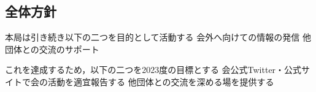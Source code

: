 \subsection*{全体方針}


本局は引き続き以下の二つを目的として活動する
 会外へ向けての情報の発信
 他団体との交流のサポート


これを達成するため，以下の二つを2023度の目標とする
 会公式Twitter・公式サイトで会の活動を適宜報告する
 他団体との交流を深める場を提供する



